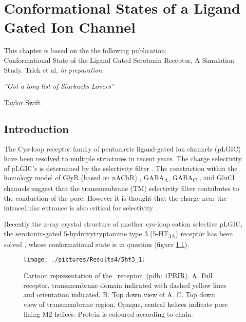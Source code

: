 \chapter{Conformational States of a Ligand Gated Ion Channel}
\label{ch:RC4}

This chapter is based on the the following publication; \\
Conformational State of the Ligand Gated Serotonin Receptor, A Simulation Study. Trick et al, \textit{in preparation}.

\epigraph{{\textit{''Got a long list of Starbucks Lovers''}}}{Taylor Swift}

\section{Introduction}

The Cys-loop receptor family of pentameric ligand-gated ion channels (pLGIC)  have been resolved to multiple structures in recent years. The charge selectivity of pLGIC's is determined by the selectivity filter \cite{Lynch2004}. The constriction within the homology model of GlyR (based on nAChR) \cite{Keramidas2002}, GABA\textsubscript{A}, GABA\textsubscript{C} \cite{Keramidas2004}, and GluCl channels \cite{Hibbs2011} suggest that the transmembrane (TM) selectivity filter contributes to the conduction of the pore. However it is thought that the charge near the intracellular entrance is also critical for selectivity \cite{Wotring2003}.

Recently the x-ray crystal structure of another cys-loop cation selective pLGIC, the serotonin-gated 5-hydroxytryptamine type 3 (5-HT\textsubscript{3A}) receptor has been solved \cite{Hassaine2014}, whose conformational state is in question (figure \ref{fig:5ht3_1}).

\vspace{10mm}

\begin{figure}[H]
\begin{center}
\texttt{[image: ./pictures/Results4/5ht3\_1]}
\caption[Cartoon representation of the \HTa\ receptor.] {Cartoon representation of the \HT\ receptor, (pdb: 4PRIR). A. Full receptor, transmembrane domain indicated with dashed yellow lines and orientation indicated. B. Top down view of A. C. Top down view of transmembrane region. Opaque, central helices indicate pore lining M2 helices. Protein is coloured according to chain.}
\label{fig:5ht3_1}
\end{center}
\end{figure}


